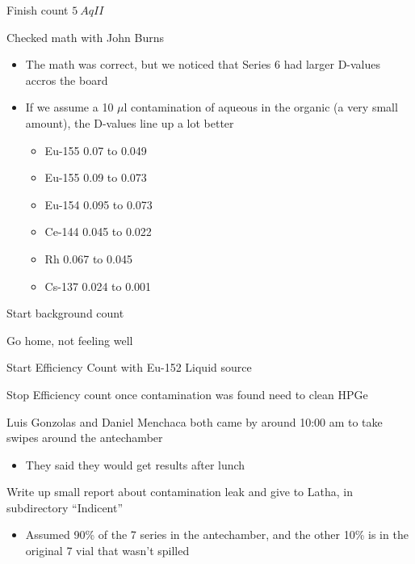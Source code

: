 \documentclass[idxtotoc,hyperref,openany,oneside]{labbook} %
\newcommand{\cmark}{\ding{51}}%
\newcommand{\xmark}{\ding{55}}%
\newcommand{\done}{\rlap{$\square$}{\raisebox{2pt}{\large\hspace{1pt}\cmark}}%
  \hspace{-2.5pt}}
\newcommand{\wontfix}{\rlap{$\square$}{\large\hspace{1pt}\xmark}}
\begin{document}

\begin{todolist}
\item[\done]{Finish count $\boxed{5\ AqII}$}
\item[\done]{Checked math with John Burns}
  \begin{itemize}
  \item{The math was correct, but we noticed that
    Series 6 had larger D-values accros the board}
  \item{If we assume a 10 $\mu$l contamination
    of aqueous in the organic (a very small amount),
    the D-values line up a lot better}
    \begin{itemize}
    \item{Eu-155 0.07 to 0.049 \done}
    \item{Eu-155 0.09 to 0.073 \wontfix}
    \item{Eu-154 0.095 to 0.073 \wontfix}
    \item{Ce-144 0.045 to 0.022 \done}
    \item{Rh     0.067 to 0.045 \done}
    \item{Cs-137 0.024 to 0.001 \done}
    \end{itemize}
  \end{itemize}
\item[\done]{Start background count}
\item[\done]{Go home, not feeling well}
\end{todolist}




\begin{todolist}
\item[\done]{Start Efficiency Count with Eu-152 Liquid source}
\item[\done]{Stop Efficiency count once contamination was found
  need to clean HPGe}
\end{todolist}

\begin{todolist}
\item[\done]{Luis Gonzolas and Daniel Menchaca both came by around
  10:00 am to take swipes around the antechamber}
  \begin{itemize}
  \item{They said they would get results after lunch}
  \end{itemize}
\item[\done]{Write up small report about contamination leak
  and give to Latha, in subdirectory ``Indicent''}
  \begin{itemize}
  \item{Assumed 90\% of the 7 series in the antechamber, and the
    other 10\% is in the original 7 vial that wasn't spilled}
  \end{itemize}
\end{todolist}
\end{document}
